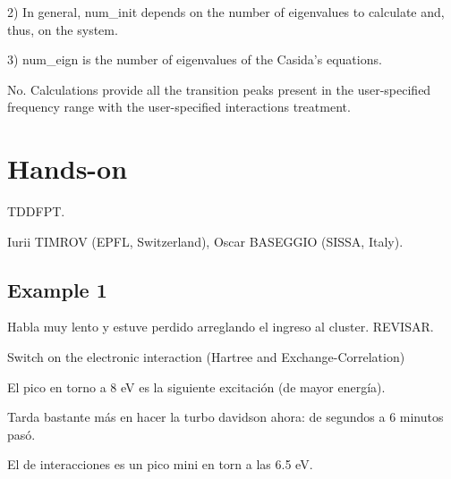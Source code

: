   2) In general, num\_init depends on the number of eigenvalues to calculate and, thus, on the system.

  3) num\_eign is the number of eigenvalues of the Casida's equations.


  No. Calculations provide all the transition peaks present in the user-specified frequency range with the user-specified interactions treatment.

\section{Hands-on}

   TDDFPT.

  	Iurii TIMROV (EPFL, Switzerland), Oscar BASEGGIO (SISSA, Italy).

\subsection{Example 1}

  Habla muy lento y estuve perdido arreglando el ingreso al cluster. REVISAR.

  Switch on the electronic interaction (Hartree and Exchange-Correlation)

  El pico en torno a 8 eV es la siguiente excitación (de mayor energía).

  Tarda bastante más en hacer la turbo davidson ahora: de segundos a 6 minutos pasó.

  El de interacciones es un pico mini en torn a las 6.5 eV.


